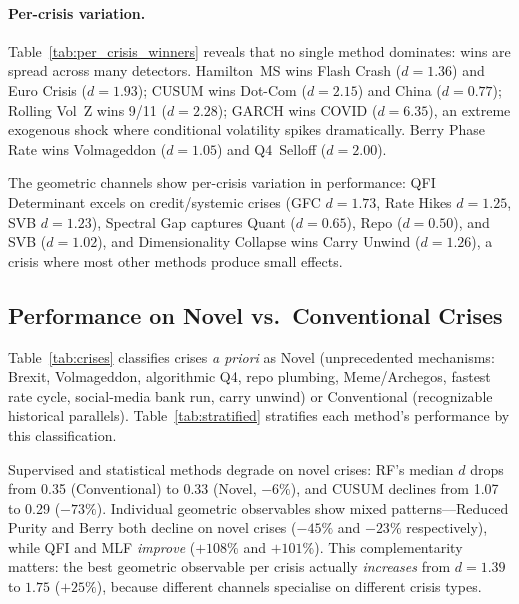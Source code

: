 \documentclass[3p]{elsarticle}
\begin{document}
\paragraph{Per-crisis variation.}
Table~\ref{tab:per_crisis_winners} reveals that no single method
dominates: wins are spread across many detectors.  Hamilton~MS wins
Flash Crash ($d = 1.36$) and Euro Crisis ($d = 1.93$);
CUSUM wins Dot-Com ($d = 2.15$) and China ($d = 0.77$);
Rolling Vol~Z wins 9/11 ($d = 2.28$);
GARCH wins COVID ($d = 6.35$), an extreme exogenous shock where
conditional volatility spikes dramatically.  Berry Phase Rate wins
Volmageddon ($d = 1.05$) and Q4~Selloff ($d = 2.00$).

The geometric channels show per-crisis variation in performance:
QFI Determinant excels on credit/systemic crises (GFC $d = 1.73$,
Rate Hikes $d = 1.25$, SVB $d = 1.23$),
Spectral Gap captures Quant ($d = 0.65$), Repo ($d = 0.50$), and
SVB ($d = 1.02$), and Dimensionality Collapse
wins Carry Unwind ($d = 1.26$), a crisis where most other methods
produce small effects.

\subsection{Performance on Novel vs.\ Conventional Crises}%
\label{subsec:novel_conventional}

Table~\ref{tab:crises} classifies crises \emph{a priori} as Novel
(unprecedented mechanisms: Brexit, Volmageddon, algorithmic Q4, repo
plumbing, Meme/Archegos, fastest rate cycle, social-media bank run,
carry unwind) or Conventional (recognizable historical parallels).
Table~\ref{tab:stratified} stratifies each method's performance by
this classification.

\begin{table}[htb]
\centering
\caption{Stratified performance: Novel vs.\ Conventional crises.
  Crisis categories defined \emph{a priori} (Table~\ref{tab:crises}).}
\label{tab:stratified}
\small

\end{table}

Supervised and statistical methods degrade on novel crises:
RF's median $d$ drops from 0.35 (Conventional) to 0.33 (Novel,
$-6\%$), and CUSUM declines from 1.07 to 0.29 ($-73\%$).
Individual geometric observables show mixed patterns---Reduced
Purity and Berry both decline on novel crises ($-45\%$ and $-23\%$
respectively), while QFI and MLF \emph{improve} ($+108\%$ and $+101\%$).
This complementarity matters: the best geometric
observable per crisis actually \emph{increases} from $d = 1.39$ to $1.75$
($+25\%$), because different channels specialise on different crisis types.
\end{document}
